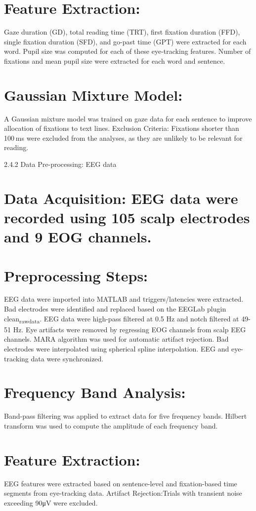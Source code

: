 \documentclass[11pt]{article}
\begin{document}
\section{Feature Extraction:}
\label{sec:orga713bbb}
Gaze duration (GD), total reading time (TRT), first fixation duration (FFD), single fixation duration (SFD), and go-past time (GPT) were extracted for each word.
Pupil size was computed for each of these eye-tracking features.
Number of fixations and mean pupil size were extracted for each word and sentence.
\section{Gaussian Mixture Model:}
\label{sec:orgd740d3b}
A Gaussian mixture model was trained on gaze data for each sentence to improve allocation of fixations to text lines.
Exclusion Criteria: Fixations shorter than 100 ms were excluded from the analyses, as they are unlikely to be relevant for reading.

2.4.2 Data Pre-processing: EEG data

\section{Data Acquisition: EEG data were recorded using 105 scalp electrodes and 9 EOG channels.}
\label{sec:org789ad45}
\section{Preprocessing Steps:}
\label{sec:orgb4504db}
EEG data were imported into MATLAB and triggers/latencies were extracted.
Bad electrodes were identified and replaced based on the EEGLab plugin clean\textsubscript{rawdata}.
EEG data were high-pass filtered at 0.5 Hz and notch filtered at 49-51 Hz.
Eye artifacts were removed by regressing EOG channels from scalp EEG channels.
MARA algorithm was used for automatic artifact rejection.
Bad electrodes were interpolated using spherical spline interpolation.
EEG and eye-tracking data were synchronized.
\section{Frequency Band Analysis:}
\label{sec:org27acc18}
Band-pass filtering was applied to extract data for five frequency bands.
Hilbert transform was used to compute the amplitude of each frequency band.
\section{Feature Extraction:}
\label{sec:org4db85b9}
EEG features were extracted based on sentence-level and fixation-based time segments from eye-tracking data.
Artifact Rejection:Trials with transient noise exceeding 90μV were excluded.
\end{document}
